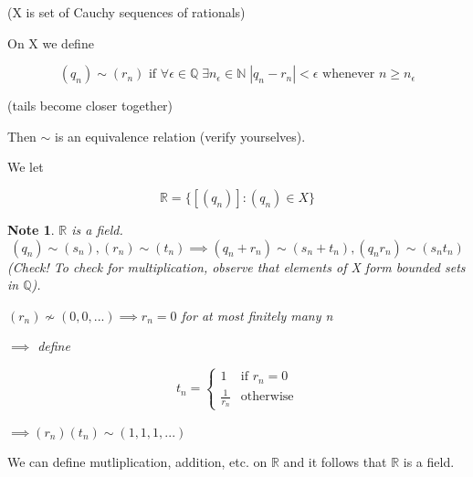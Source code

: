 \documentclass[11pt, oneside]{book}
\theoremstyle{break}
\newtheorem*{note}{Note}
\newcommand{\bb}[1]{\mathbb{#1}}			%
\begin{document}
(X is set of Cauchy sequences of rationals)

On X we define

\begin{equation}
	(q_n) \sim (r_n) \text{ if } \forall \epsilon \in \bb{Q} \; \exists n_\epsilon \in \bb{N} \; |q_n - r_n| < \epsilon \text{ whenever } n \geq n_\epsilon
\end{equation}

(tails become closer together)

Then $\sim$ is an equivalence relation (verify yourselves).

We let 

\begin{equation}
	\bb{R} = \{[(q_n)] : (q_n) \in X\}
\end{equation}

\begin{note}
	$\bb{R}$ is a field.
	\begin{equation}
		(q_n) \sim (s_n), (r_n) \sim (t_n) \implies (q_n + r_n) \sim (s_n + t_n), (q_n r_n) \sim (s_n t_n)
	\end{equation}
	(Check! To check for multiplication, observe that elements of X form bounded sets in $\bb{Q}$).

	$(r_n) \nsim (0, 0, ...) \implies r_n = 0$ for at most finitely many n

	$\implies$ define

	\[
	t_n =
	\begin{cases}
		1 				& \text{if } r_n = 0 \\
		\frac{1}{r_n} 	& \text{otherwise}
	\end{cases}
	\]

	$\implies (r_n)(t_n) \sim (1, 1, 1, ...)$
\end{note}

We can define mutliplication, addition, etc. on $\bb{R}$ and it follows that $\bb{R}$ is a field.
\end{document}

